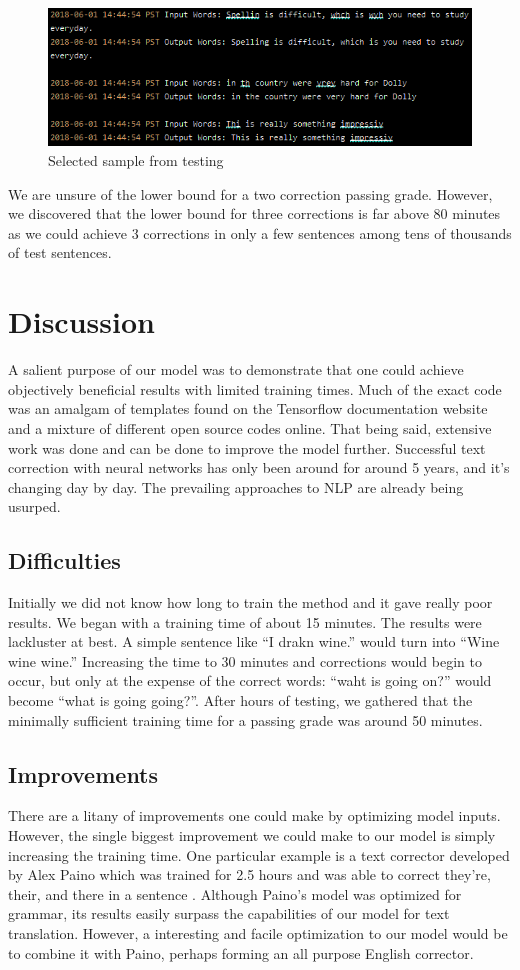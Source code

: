 \documentclass[11pt,a4paper]{scrartcl}
\theoremstyle{definition}
\begin{document}
\begin{figure}[!ht]
\centering
\includegraphics[scale=1]{results_1.png}
\caption{Selected sample from testing}
\label{figR1}
\end{figure}
\FloatBarrier

We are unsure of the lower bound for a two correction passing grade. However, we discovered that the lower bound for three corrections is far above 80 minutes as we could achieve 3 corrections in only a few sentences among tens of thousands of test sentences.

\section{Discussion}
A salient purpose of our model was to demonstrate that one could achieve objectively beneficial results with limited training times. Much of the exact code was an amalgam of templates found on the Tensorflow documentation website and a mixture of different open source codes online. That being said, extensive work was done and can be done to improve the model further. Successful text correction with neural networks has only been around for around 5 years, and it's changing day by day. The prevailing approaches to NLP are already being usurped.

\subsection{Difficulties}
Initially we did not know how long to train the method and it gave really poor results. We began with a training time of about 15 minutes. The results were lackluster at best. A simple sentence like “I drakn wine.” would turn into “Wine wine wine.” Increasing the time to 30 minutes and corrections would begin to occur, but only at the expense of the correct words: “waht is going on?” would become “what is going going?”. After hours of testing, we gathered that the minimally sufficient training time for a passing grade was around 50 minutes. 
\subsection{Improvements}
There are a litany of improvements one could make by optimizing model inputs. However, the single biggest improvement we could make to our model is simply increasing the training time. One particular example is a text corrector developed by Alex Paino which was trained for 2.5 hours and was able to correct they're, their, and there in a sentence \cite{Floyd}. Although Paino's model was optimized for grammar, its results easily surpass the capabilities of our model for text translation. However, a interesting and facile optimization to our model would be to combine it with Paino, perhaps forming an all purpose English corrector.
\end{document}
